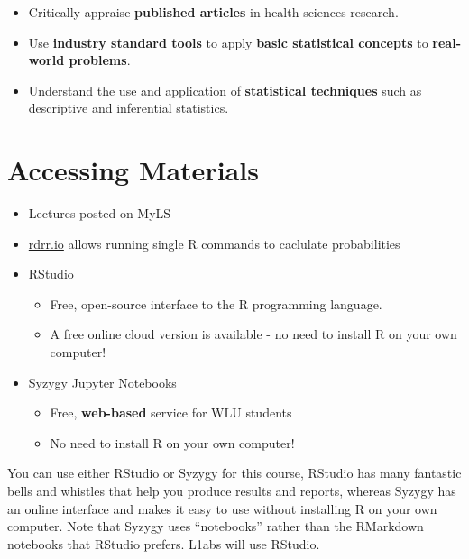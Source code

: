 \documentclass[
  letterpaper,
  DIV=11,
  numbers=noendperiod,
  oneside]{scrreprt}
\providecommand{\tightlist}{%
  \setlength{\itemsep}{0pt}\setlength{\parskip}{0pt}}\usepackage{longtable,booktabs,array}
\begin{document}

\begin{itemize}
\tightlist
\item
  Critically appraise \textbf{published articles} in health sciences
  research.\lspace
\item
  Use \textbf{industry standard tools} to apply \textbf{basic
  statistical concepts} to \textbf{real-world problems}.\lspace
\item
  Understand the use and application of \textbf{statistical techniques}
  such as descriptive and inferential statistics.
\end{itemize}

\hypertarget{accessing-materials}{%
\section*{Accessing Materials}\label{accessing-materials}}


\begin{itemize}
\tightlist
\item
  Lectures posted on MyLS\lspace
\item
  \url{rdrr.io} allows running single R commands to caclulate
  probabilities
\item
  RStudio

  \begin{itemize}
  \tightlist
  \item
    Free, open-source interface to the R programming language.
  \item
    A free online cloud version is available - no need to install R on
    your own computer!\lspace
  \end{itemize}
\item
  Syzygy Jupyter Notebooks

  \begin{itemize}
  \tightlist
  \item
    Free, \textbf{web-based} service for WLU students
  \item
    No need to install R on your own computer!
  \end{itemize}
\end{itemize}

You can use either RStudio or Syzygy for this course, RStudio has many
fantastic bells and whistles that help you produce results and reports,
whereas Syzygy has an online interface and makes it easy to use without
installing R on your own computer. Note that Syzygy uses ``notebooks''
rather than the RMarkdown notebooks that RStudio prefers. L1abs will use
RStudio.
\end{document}
